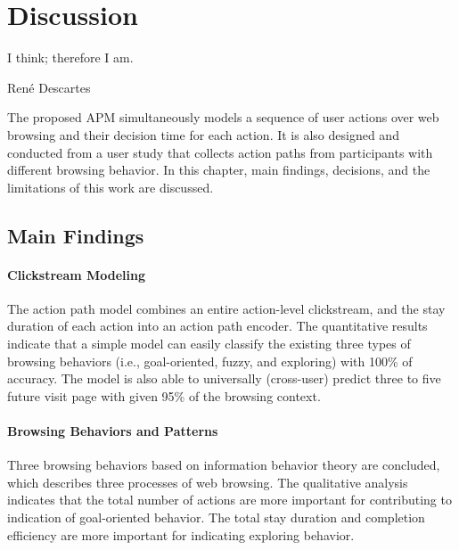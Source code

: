 \section{Discussion}
\label{ch:discuss}

\epigraph{I think; therefore I am.}{Ren\'e Descartes}

The proposed APM simultaneously models a sequence of user actions 
over web browsing and their decision time for each action.
It is also designed and conducted from a user study that collects action paths
from participants with different browsing behavior.
In this chapter, main findings, decisions, and the limitations of this work are discussed.

\subsection{Main Findings}

\paragraph{Clickstream Modeling}

The action path model combines an entire action-level clickstream,
and the stay duration of each action into an action path encoder.
The quantitative results indicate that 
a simple model can easily classify the existing three types of browsing
behaviors (i.e., goal-oriented, fuzzy, and exploring) with 100\% of accuracy.
The model is also able to universally (cross-user) predict three to five future visit 
page with given 95\% of the browsing context.

\paragraph{Browsing Behaviors and Patterns}

Three browsing behaviors based on information behavior theory are concluded, which describes
three processes of web browsing.
The qualitative analysis indicates that the total number of actions are more important 
for contributing to indication of goal-oriented behavior.
The total stay duration and completion efficiency are more important for indicating 
exploring behavior.

